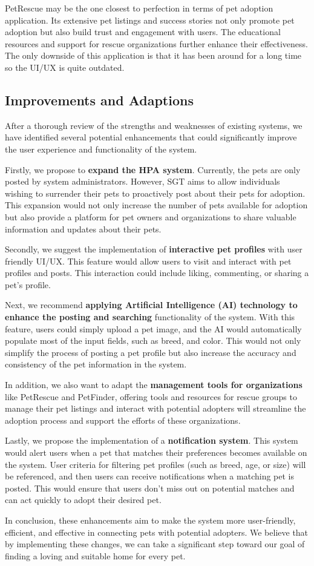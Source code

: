PetRescue may be the one closest to perfection in terms of pet adoption application. Its extensive pet listings and success stories not only promote pet adoption but also build trust and engagement with users. The educational resources and support for rescue organizations further enhance their effectiveness. The only downside of this application is that it has been around for a long time so the UI/UX is quite outdated.


\subsection{Improvements and Adaptions}

After a thorough review of the strengths and weaknesses of existing systems, we have identified several potential enhancements that could significantly improve the user experience and functionality of the system.

Firstly, we propose to \textbf{expand the HPA system}. Currently, the pets are only posted by system administrators. However, SGT aims to allow individuals wishing to surrender their pets to proactively post about their pets for adoption. This expansion would not only increase the number of pets available for adoption but also provide a platform for pet owners and organizations to share valuable information and updates about their pets.

Secondly, we suggest the implementation of \textbf{interactive pet profiles} with user friendly UI/UX. This feature would allow users to visit and interact with pet profiles and posts. This interaction could include liking, commenting, or sharing a pet’s profile.

Next, we recommend \textbf{applying Artificial Intelligence (AI) technology to enhance the posting and searching} functionality of the system. With this feature, users could simply upload a pet image, and the AI would automatically populate most of the input fields, such as breed, and color. This would not only simplify the process of posting a pet profile but also increase the accuracy and consistency of the pet information in the system.

In addition, we also want to adapt the \textbf{management tools for organizations} like PetRescue and PetFinder, offering tools and resources for rescue groups to manage their pet listings and interact with potential adopters will streamline the adoption process and support the efforts of these organizations.

Lastly, we propose the implementation of a \textbf{notification system}. This system would alert users when a pet that matches their preferences becomes available on the system. User criteria for filtering pet profiles (such as breed, age, or size) will be referenced, and then users can receive notifications when a matching pet is posted. This would ensure that users don’t miss out on potential matches and can act quickly to adopt their desired pet.

In conclusion, these enhancements aim to make the system more user-friendly, efficient, and effective in connecting pets with potential adopters. We believe that by implementing these changes, we can take a significant step toward our goal of finding a loving and suitable home for every pet.
